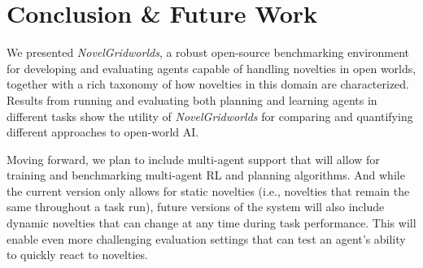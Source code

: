 \documentclass[sigconf]{aamas}
\begin{document}
\section{Conclusion \& Future Work}
\label{sec:conclusion}
We presented {\em NovelGridworlds}, a robust open-source benchmarking environment for developing and evaluating agents capable of handling novelties in open worlds, together with a rich taxonomy of how novelties in this domain are characterized.  Results from running and evaluating both planning and learning agents in different tasks show the utility of {\em NovelGridworlds} for comparing and quantifying different approaches to open-world AI.

Moving forward, we plan to include multi-agent support that will allow for training and benchmarking multi-agent RL and planning algorithms.  And while the current version only allows for static novelties (i.e., novelties that remain the same throughout a task run), future versions of the system will also include dynamic novelties that can change at any time during task performance.  This will enable even more challenging evaluation settings that can test an agent's ability to quickly react to novelties.




\end{document}
